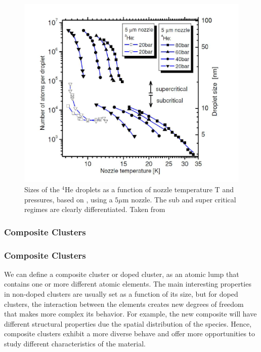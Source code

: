 \begin{figure}[h!]
\centering
\label{img:dropletSize}
\includegraphics[scale=0.4]{../Images/sizes_regimen.PNG}
\caption[Expansion droplets Regimens]{Sizes of the $^{4}$He droplets  as a function of nozzle temperature T and  pressures, based on \cite{toennies_spectroscopy_1998}, using a $5 \mu $m nozzle. The sub and super critical regimes are clearly differentiated. Taken from \cite{stienkemeier_spectroscopy_2006}}
\end{figure}

\subsubsection{Composite Clusters}

\subsubsection{Composite Clusters}

We can define a composite cluster or doped cluster, as an atomic lump that contains one or more different atomic elements. The main interesting properties in non-doped clusters are usually set as a function of its size, but for doped clusters, the interaction between the elements creates new degrees of freedom that makes more complex its behavior. For example, the new composite will have different structural properties due the spatial distribution of the species. Hence, composite clusters exhibit a more diverse behave and offer more opportunities to study different characteristics of the material.

